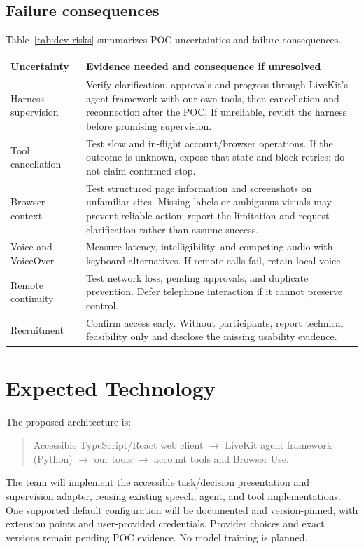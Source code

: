 \documentclass[11pt]{article}
\begin{document}
\subsection{Failure consequences}
Table~\ref{tab:dev-risks} summarizes POC uncertainties and failure consequences.
\begin{center}
\begin{minipage}{\textwidth}
\label{tab:dev-risks}
\begin{tabularx}{\textwidth}{>{\raggedright\arraybackslash}p{}X}
\toprule Uncertainty & Evidence needed and consequence if unresolved\\\midrule
Harness supervision & Verify clarification, approvals and progress through LiveKit's agent framework with our own tools, then cancellation and reconnection after the POC. If unreliable, revisit the harness before promising supervision.\\
Tool cancellation & Test slow and in-flight account/browser operations. If the outcome is unknown, expose that state and block retries; do not claim confirmed stop.\\
Browser context & Test structured page information and screenshots on unfamiliar sites. Missing labels or ambiguous visuals may prevent reliable action; report the limitation and request clarification rather than assume success.\\
Voice and VoiceOver & Measure latency, intelligibility, and competing audio with keyboard alternatives. If remote calls fail, retain local voice.\\
Remote continuity & Test network loss, pending approvals, and duplicate prevention. Defer telephone interaction if it cannot preserve control.\\
Recruitment & Confirm access early. Without participants, report technical feasibility only and disclose the missing usability evidence.\\\bottomrule
\end{tabularx}
\end{minipage}
\end{center}

\section{Expected Technology}
The proposed architecture is:
\begin{quote}
Accessible TypeScript/React web client $\rightarrow$ LiveKit agent framework
(Python) $\rightarrow$ our tools $\rightarrow$ account tools and Browser Use.
\end{quote}
The team will implement the accessible task/decision presentation and supervision
adapter, reusing existing speech, agent, and tool implementations. One supported
default configuration will be documented and version-pinned, with extension
points and user-provided credentials. Provider choices and exact versions remain
pending POC evidence. No model training is planned.
\end{document}
